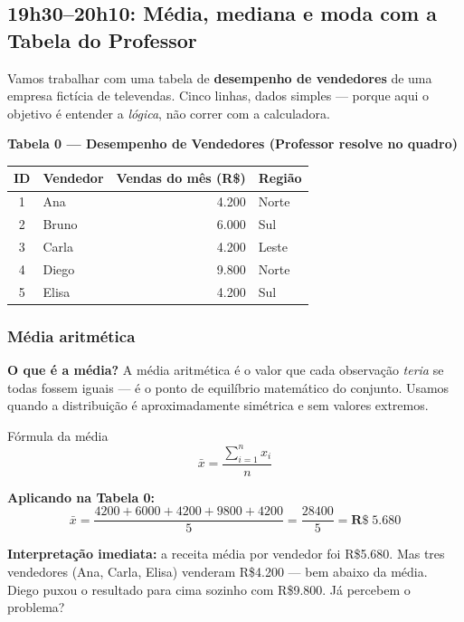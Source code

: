 \subsection{19h30–20h10: Média, mediana e moda com a Tabela do Professor}

Vamos trabalhar com uma tabela de \textbf{desempenho de vendedores} de uma
empresa fictícia de televendas. Cinco linhas, dados simples — porque aqui o
objetivo é entender a \emph{lógica}, não correr com a calculadora.

\begin{BoardBox}
\textbf{Tabela 0 — Desempenho de Vendedores (Professor resolve no quadro)}
\begin{tabular}{|c|l|r|l|}
\hline
\textbf{ID} & \textbf{Vendedor} & \textbf{Vendas do mês (R\$)} & \textbf{Região} \\
\hline
1 & Ana     & 4.200 & Norte \\
2 & Bruno   & 6.000 & Sul   \\
3 & Carla   & 4.200 & Leste \\
4 & Diego   & 9.800 & Norte \\
5 & Elisa   & 4.200 & Sul   \\
\hline
\end{tabular}
\end{BoardBox}

\subsubsection*{Média aritmética}

\begin{SolvedBox}
\textbf{O que é a média?} A média aritmética é o valor que cada observação
\emph{teria} se todas fossem iguais — é o ponto de equilíbrio matemático do
conjunto. Usamos quando a distribuição é aproximadamente simétrica e sem
valores extremos.

\begin{FormulaBox}{Fórmula da média}
\[
\bar{x} = \frac{\sum_{i=1}^{n} x_i}{n}
\]
\end{FormulaBox}

\textbf{Aplicando na Tabela 0:}
\[
\bar{x} = \frac{4200 + 6000 + 4200 + 9800 + 4200}{5}
= \frac{28400}{5}
= \mathbf{R\$\;5.680}
\]

\textbf{Interpretação imediata:} a receita média por vendedor foi R\$5.680.
Mas tres vendedores (Ana, Carla, Elisa) venderam R\$4.200 — bem abaixo da
média. Diego puxou o resultado para cima sozinho com R\$9.800. Já percebem
o problema?
\end{SolvedBox}

